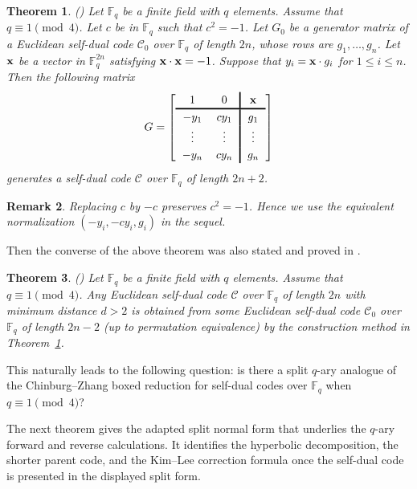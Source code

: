 \documentclass[12pt]{article}
\newtheorem{theorem}{Theorem}[section]
\newtheorem{remark}[theorem]{Remark}
\begin{document}
\begin{theorem}(\cite[Proposition 2.1]{KimLee}) \label{thm-q-ary-build-1}
Let $\mathbb F_q$ be a finite field with $q$ elements. Assume that $q \equiv 1 \pmod{4}$. Let $c$ be in $\mathbb F_q$ such that $c^2 = -1$. Let $G_0$ be a generator matrix of a Euclidean self-dual code $\mathcal C_0$ over $\mathbb F_q$ of length $2n$, whose rows are $g_1, \dots, g_n$. Let $\bf x$ be a vector in $\mathbb F_q^{2n}$ satisfying ${\bf x} \cdot {\bf x} = -1$. Suppose that $y_i ={\bf x} \cdot g_i$ for $1 \le i \le n$. Then the following matrix
\[
\begingroup
\setlength{\arraycolsep}{6pt}
\renewcommand{\arraystretch}{1.2}
G=
\left[
\begin{array}{cc!{\vrule width 1.2pt}c}
1 & 0 & \mathbf{x}\\
\noalign{\hrule height 1.2pt}
-y_1 & c y_1 & g_1\\
\vdots & \vdots & \vdots\\
-y_n & c y_n & g_n
\end{array}
\right]
\endgroup
\]
generates a self-dual code $\mathcal C$ over $\mathbb F_q$ of length $2n+2$.
\end{theorem}

\begin{remark}
\rm
Replacing \(c\) by \(-c\) preserves \(c^2=-1\).  Hence we use the equivalent
normalization \((-y_i,-cy_i,g_i)\) in the sequel.
\end{remark}

 Then the converse of the above theorem was also stated and proved in \cite{KimLee}.

\begin{theorem}(\cite[Proposition 2.2]{KimLee}) \label{thm-q-ary-build-2}
Let $\mathbb F_q$ be a finite field with $q$ elements. Assume that $q \equiv 1 \pmod{4}$. Any Euclidean self-dual code $\mathcal C$ over $\mathbb F_q$ of length $2n$ with minimum distance $d >2$ is obtained from some Euclidean self-dual code $\mathcal C_0$ over $\mathbb F_q$ of length $2n-2$ (up to permutation equivalence) by the construction method in Theorem~\ref{thm-q-ary-build-1}.
\end{theorem}

This naturally leads to the following question: is there a split \(q\)-ary analogue of the Chinburg--Zhang boxed reduction for self-dual codes over \(\mathbb F_q\) when \(q\equiv 1 \pmod 4\)?

The next theorem gives the adapted split normal form that underlies the \(q\)-ary forward and reverse calculations. It identifies the hyperbolic decomposition, the shorter parent code, and the Kim--Lee correction formula once the self-dual code is presented in the displayed split form.
\end{document}
